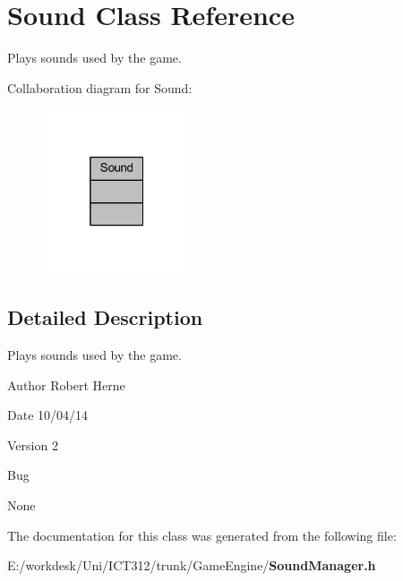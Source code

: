 \section{Sound Class Reference}
\label{class_sound}


Plays sounds used by the game.  




Collaboration diagram for Sound\+:\nopagebreak
\begin{figure}[H]
\begin{center}
\leavevmode
\includegraphics[width=124pt]{d4/df2/class_sound__coll__graph}
\end{center}
\end{figure}


\subsection{Detailed Description}
Plays sounds used by the game. 

\begin{DoxyAuthor}{Author}
Robert Herne 
\end{DoxyAuthor}
\begin{DoxyDate}{Date}
10/04/14 
\end{DoxyDate}
\begin{DoxyVersion}{Version}
2
\end{DoxyVersion}
\begin{DoxyRefDesc}{Bug}
\item[{\bf Bug}]None \end{DoxyRefDesc}


The documentation for this class was generated from the following file\+:\begin{DoxyCompactItemize}
\item 
E\+:/workdesk/\+Uni/\+I\+C\+T312/trunk/\+Game\+Engine/{\bf Sound\+Manager.\+h}\end{DoxyCompactItemize}
